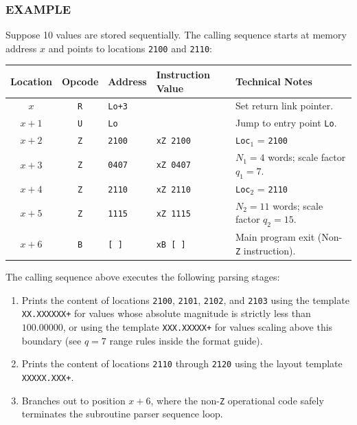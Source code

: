 \subsubsection*{EXAMPLE}
Suppose 10 values are stored sequentially. The calling sequence starts at memory address $x$ and points to locations \texttt{2100} and \texttt{2110}:
\begin{center}
\small
\begin{tabularx}{\textwidth}{ccllX}
    \toprule
    \textbf{Location} & \textbf{Opcode} & \textbf{Address} & \textbf{Instruction Value} & \textbf{Technical Notes} \\
    \midrule
    $x$   & \texttt{R} & \texttt{Lo+3} &                    & Set return link pointer. \\
    $x+1$ & \texttt{U} & \texttt{Lo}   &                    & Jump to entry point \texttt{Lo}. \\
    $x+2$ & \texttt{Z} & \texttt{2100} & \texttt{xZ 2100}   & \texttt{Loc}$_1$ = \texttt{2100} \\
    $x+3$ & \texttt{Z} & \texttt{0407} & \texttt{xZ 0407}   & $N_1 = 4$ words; scale factor $q_1 = 7$. \\
    $x+4$ & \texttt{Z} & \texttt{2110} & \texttt{xZ 2110}   & \texttt{Loc}$_2$ = \texttt{2110} \\
    $x+5$ & \texttt{Z} & \texttt{1115} & \texttt{xZ 1115}   & $N_2 = 11$ words; scale factor $q_2 = 15$. \\
    $x+6$ & \texttt{B} & \texttt{[ ]}  & \texttt{xB [ ]}    & Main program exit (Non-\texttt{Z} instruction). \\
    \bottomrule
\end{tabularx}
\end{center}

The calling sequence above executes the following parsing stages:
\begin{enumerate}
    \item Prints the content of locations \texttt{2100}, \texttt{2101}, \texttt{2102}, and \texttt{2103} using the template \texttt{XX.XXXXXX+} for values whose absolute magnitude is strictly less than $100.00000$, or using the template \texttt{XXX.XXXXX+} for values scaling above this boundary (see $q=7$ range rules inside the format guide).
    \item Prints the content of locations \texttt{2110} through \texttt{2120} using the layout template \texttt{XXXXX.XXX+}.
    \item Branches out to position $x+6$, where the non-\texttt{Z} operational code safely terminates the subroutine parser sequence loop.
\end{enumerate}

